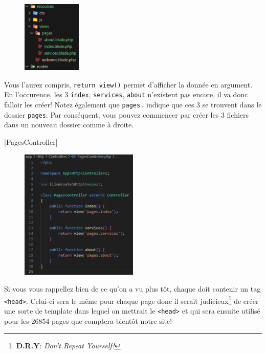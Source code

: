 \documentclass[internal]{nhitec_design}
\begin{document}
\begin{figure}
    \vspace{-0.5cm}
    \includegraphics[width=0.25\textwidth]{figures-C1/3_premieres_views.pdf}
\end{figure}

Vous l'aurez compris, \verb|return view()| permet d'afficher la \view{} donnée en argument. En l'occurence, les 3 \views{} \verb|index|, \verb|services|, \verb|about| n'existent pas encore, il va donc falloir les créer! Notez également que \verb|pages.| indique que ces 3 \views{} se trouvent dans le dossier \verb|pages|. Par conséquent, vous pouvez commencer par créer les 3 fichiers dans un nouveau dossier comme à droite.

\newpage 
{}|PagesController|
\begin{figure}
    \centering
    \includegraphics[width=0.5\textwidth]{figures-C1/pages_controller_1.pdf}
    \caption{\protect{}\label{fig:PagesController1}}
\end{figure}
Si vous vous rappellez bien de ce qu'on a vu plus tôt, chaque \view{} \html{} doit contenir un tag \verb|<head>|. Celui-ci sera le même pour chaque page donc il serait judicieux\footnote{\textbf{D.R.Y}: \textit{Don't Repeat Yourself!}} de créer une sorte de template dans lequel on mettrait le \verb|<head>| et qui sera ensuite utilisé pour les 26854 pages que comptera bientôt notre site! 
\end{document}
